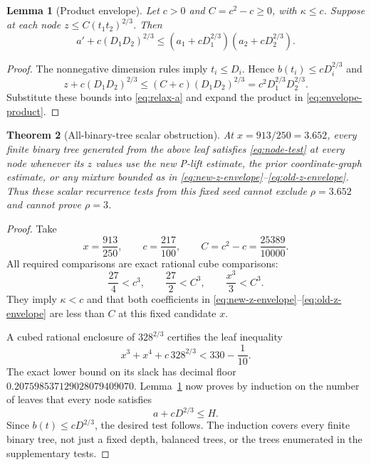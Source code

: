 \documentclass[11pt]{article}
\newtheorem{theorem}{Theorem}[section]
\newtheorem{lemma}[theorem]{Lemma}
\theoremstyle{definition}\newtheorem{definition}[theorem]{Definition}
\theoremstyle{remark}\newtheorem{remark}[theorem]{Remark}
\begin{document}
\begin{lemma}[Product envelope]\label{lem:envelope}
Let $c>0$ and $C=c^2-c\geq0$, with $\kappa\leq c$. Suppose at each node $z\leq C(t_1t_2)^{2/3}$. Then
\begin{equation}\label{eq:envelope-product}
 a'+c(D_1D_2)^{2/3}
 \leq(a_1+cD_1^{2/3})(a_2+cD_2^{2/3}).
\end{equation}
\end{lemma}
\begin{proof}
The nonnegative dimension rules imply $t_i\leq D_i$. Hence $b(t_i)\leq cD_i^{2/3}$ and
\[
 z+c(D_1D_2)^{2/3}
 \leq(C+c)(D_1D_2)^{2/3}
 =c^2D_1^{2/3}D_2^{2/3}.
\]
Substitute these bounds into \eqref{eq:relax-a} and expand the product in \eqref{eq:envelope-product}.
\end{proof}

\begin{theorem}[All-binary-tree scalar obstruction]\label{thm:barrier}
At $x=913/250=3.652$, every finite binary tree generated from the above leaf satisfies \eqref{eq:node-test} at every node whenever its $z$ values use the new P-lift estimate, the prior coordinate-graph estimate, or any mixture bounded as in \eqref{eq:new-z-envelope}--\eqref{eq:old-z-envelope}. Thus these scalar recurrence tests from this fixed seed cannot exclude $\rho=3.652$ and cannot prove $\rho=3$.
\end{theorem}
\begin{proof}
Take
\begin{equation}\label{eq:envelope-constants}
 x=\frac{913}{250},\qquad c=\frac{217}{100},\qquad
 C=c^2-c=\frac{25389}{10000}.
\end{equation}
All required comparisons are exact rational cube comparisons:
\begin{equation}\label{eq:cube-comparisons}
 \frac{27}{4}<c^3,\qquad
 \frac{27}{2}<C^3,\qquad
 \frac{x^3}{3}<C^3.
\end{equation}
They imply $\kappa<c$ and that both coefficients in \eqref{eq:new-z-envelope}--\eqref{eq:old-z-envelope} are less than $C$ at this fixed candidate $x$.

A cubed rational enclosure of $328^{2/3}$ certifies the leaf inequality
\begin{equation}\label{eq:leaf-anchor}
 x^3+x^4+c\,328^{2/3}<330-\frac1{10}.
\end{equation}
The exact lower bound on its slack has decimal floor $0.207598537129028079409070$. Lemma~\ref{lem:envelope} now proves by induction on the number of leaves that every node satisfies
\[
 a+cD^{2/3}\leq H.
\]
Since $b(t)\leq cD^{2/3}$, the desired test follows. The induction covers every finite binary tree, not just a fixed depth, balanced trees, or the trees enumerated in the supplementary tests.
\end{proof}
\end{document}
